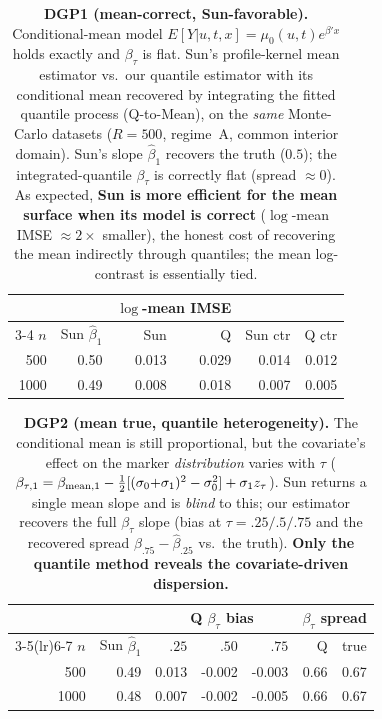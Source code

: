 \begin{table}[t]\centering\small
\caption{\textbf{DGP1 (mean-correct, Sun-favorable).} Conditional-mean model $E[Y|u,t,x]=\mu_0(u,t)e^{\beta'x}$ holds exactly and $\beta_\tau$ is flat. Sun's profile-kernel mean estimator vs.\ our quantile estimator with its conditional mean recovered by integrating the fitted quantile process (Q-to-Mean), on the \emph{same} Monte-Carlo datasets ($R=500$, regime~A, common interior domain). Sun's slope $\widehat\beta_1$ recovers the truth ($0.5$); the integrated-quantile $\beta_\tau$ is correctly flat (spread $\approx0$). As expected, \textbf{Sun is more efficient for the mean surface when its model is correct} ($\log$-mean IMSE $\approx2\times$ smaller), the honest cost of recovering the mean indirectly through quantiles; the mean log-contrast is essentially tied.}
\label{tab:cmpA}\begin{tabular}{rr rr rr}\toprule
&&\multicolumn{2}{c}{$\log$-mean IMSE}&&\\
\cmidrule(lr){3-4}
$n$&Sun $\widehat\beta_1$&Sun&Q&Sun ctr&Q ctr\\\midrule
500 & 0.50 & 0.013 & 0.029 & 0.014 & 0.012 \\
1000 & 0.49 & 0.008 & 0.018 & 0.007 & 0.005 \\
\bottomrule\end{tabular}\end{table}

\begin{table}[t]\centering\small
\caption{\textbf{DGP2 (mean true, quantile heterogeneity).} The conditional mean is still proportional, but the covariate's effect on the marker \emph{distribution} varies with $\tau$ ($\beta_{\tau,1}=\beta_{{\rm mean},1}-\tfrac12[(\sigma_0{+}\sigma_1)^2-\sigma_0^2]+\sigma_1 z_\tau$). Sun returns a single mean slope and is \emph{blind} to this; our estimator recovers the full $\beta_\tau$ slope (bias at $\tau{=}.25/.5/.75$ and the recovered spread $\widehat\beta_{.75}-\widehat\beta_{.25}$ vs.\ the truth). \textbf{Only the quantile method reveals the covariate-driven dispersion.}}
\label{tab:cmpB}\begin{tabular}{rr rrr rr}\toprule
&&\multicolumn{3}{c}{Q $\beta_\tau$ bias}&\multicolumn{2}{c}{$\beta_\tau$ spread}\\
\cmidrule(lr){3-5}\cmidrule(lr){6-7}
$n$&Sun $\widehat\beta_1$&$.25$&$.50$&$.75$&Q&true\\\midrule
500 & 0.49 & 0.013 & -0.002 & -0.003 & 0.66 & 0.67 \\
1000 & 0.48 & 0.007 & -0.002 & -0.005 & 0.66 & 0.67 \\
\bottomrule\end{tabular}\end{table}

